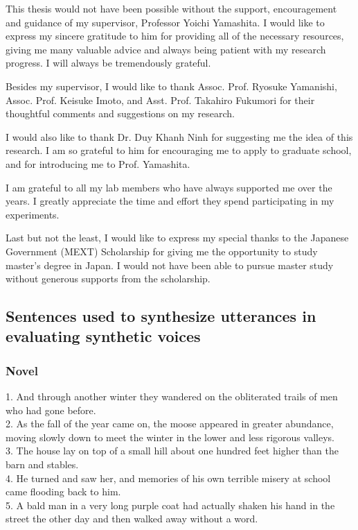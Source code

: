 \documentclass[12pt]{article}
\begin{document}
\clearpage
\acknowledgements
This thesis would not have been possible without the support, encouragement and guidance of my supervisor, Professor Yoichi Yamashita. I would like to express my sincere gratitude to him for providing all of the necessary resources, giving me many valuable advice and always being patient with my research progress. I will always be tremendously grateful.

Besides my supervisor, I would like to thank Assoc. Prof. Ryosuke Yamanishi, Assoc. Prof. Keisuke Imoto, and Asst. Prof. Takahiro Fukumori for their thoughtful comments and suggestions on my research.

I would also like to thank Dr. Duy Khanh Ninh for suggesting me the idea of this research. I am so grateful to him for encouraging me to apply to graduate school, and for introducing me to Prof. Yamashita.

I am grateful to all my lab members who have always supported me over the years. I greatly appreciate the time and effort they spend participating in my experiments.

Last but not the least, I would like to express my special thanks to the Japanese Government (MEXT) Scholarship for giving me the opportunity to study master's degree in Japan. I would not have been able to pursue master study without generous supports from the scholarship.



\newpage



\clearpage
\appendix
\setcounter{secnumdepth}{0}
\subsection{Sentences used to synthesize utterances in evaluating synthetic voices}\label{sec_appendix}

\subsubsection{Novel}
1.	And through another winter they wandered on the obliterated trails of men who had gone before.\\
2.	As the fall of the year came on, the moose appeared in greater abundance, moving slowly down to meet the winter in the lower and less rigorous valleys.\\
3.	The house lay on top of a small hill about one hundred feet higher than the barn and stables.\\
4.	He turned and saw her, and memories of his own terrible misery at school came flooding back to him.\\
5.	A bald man in a very long purple coat had actually shaken his hand in the street the other day and then walked away without a word.
\end{document}
